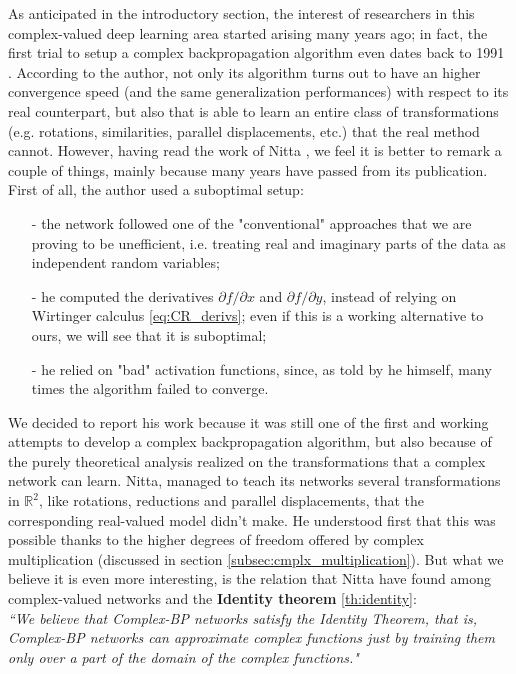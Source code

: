 \documentclass[../main.tex]{subfiles}
\begin{document}
As anticipated in the introductory section, the interest of researchers in this complex-valued deep learning area started arising many years ago; in fact, the first trial to setup a complex backpropagation algorithm even dates back to 1991 \cite{Nitta_complexBP}. According to the author, not only its algorithm turns out to have an higher convergence speed (and the same generalization performances) with respect to its real counterpart, but also that is able to learn an entire class of transformations (e.g. rotations, similarities, parallel displacements, etc.) that the real method cannot. However, having read the work of Nitta \cite{Nitta_complexBP}, we feel it is better to remark a couple of things, mainly because many years have passed from its publication. First of all, the author used a suboptimal setup:
\begin{itemize}
	\item[-] the network followed one of the "conventional" approaches that we are proving to be unefficient, i.e. treating real and imaginary parts of the data as independent random variables;
	\item[-] he computed the derivatives $\partial f/\partial x$ and $\partial f/\partial y$, instead of relying on Wirtinger calculus \ref{eq:CR_derivs}; even if this is a working alternative to ours, we will see that it is suboptimal;
	\item[-] he relied on "bad" activation functions, since, as told by he himself, many times the algorithm failed to converge.
\end{itemize}
We decided to report his work because it was still one of the first and working attempts to develop a complex backpropagation algorithm, but also because of the purely theoretical analysis realized on the transformations that a complex network can learn. Nitta, managed to teach its networks several transformations in $\mathds{R}^2$, like rotations, reductions and parallel displacements, that the corresponding real-valued model didn't	make. He understood first that this was possible thanks to the higher degrees of freedom offered by complex multiplication (discussed in section \ref{subsec:cmplx_multiplication}). But what we believe it is even more interesting, is the relation that Nitta have found among complex-valued networks and the \textbf{Identity theorem} \ref{th:identity}:\\ 
\textit{``We believe
that Complex-BP networks satisfy the Identity Theorem, that is, Complex-BP networks can approximate complex
functions just by training them only over a part of the
domain of the complex functions."}\\
\end{document}
